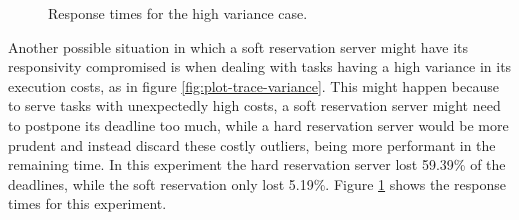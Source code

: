 \documentclass[times, 10pt,twocolumn]{article}
\begin{document}
\begin{figure}[t]
  \centering
  \caption{Response times for the high variance case.}
  \label{fig:variance}
\end{figure}

Another possible situation in which a soft reservation server might
have its responsivity compromised is when dealing with tasks having a
high variance in its execution costs, as in figure
\ref{fig:plot-trace-variance}. This might happen because to serve
tasks with unexpectedly high costs, a soft reservation server might
need to postpone its deadline too much, while a hard reservation
server would be more prudent and instead discard these costly
outliers, being more performant in the remaining time. In this
experiment the hard reservation server lost 59.39\% of the deadlines,
while the soft reservation only lost 5.19\%. Figure \ref{fig:variance}
shows the response times for this experiment.
\end{document}
